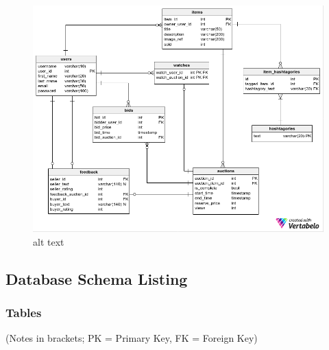 \begin{figure}[htbp]
\centering
\includegraphics{auction-erd.png}
\caption{alt text}
\end{figure}

\subsection{Database Schema Listing}\label{database-schema-listing}

\subsubsection{Tables}\label{tables}

(Notes in brackets; PK = Primary Key, FK = Foreign Key)

